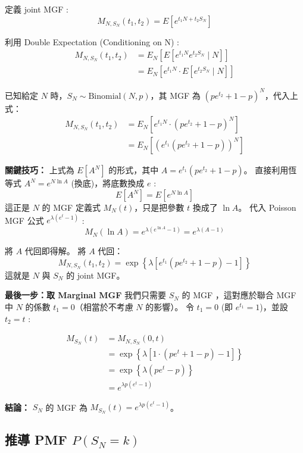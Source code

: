 \documentclass{article}
\begin{document}
\noindent
定義 joint MGF :
$$ M_{N, S_N}(t_1, t_2) = E \left[ e^{t_1 N + t_2 S_N} \right] $$

\noindent
利用 Double Expectation (Conditioning on N) :
\begin{align*}
M_{N, S_N}(t_1, t_2) &= E_N \left[ E \left[ e^{t_1 N} e^{t_2 S_N} \mid N \right] \right] \\
&= E_N \left[ e^{t_1 N} \cdot E \left[ e^{t_2 S_N} \mid N \right] \right]
\end{align*}

\noindent
已知給定 $N$ 時，$S_N \sim \text{Binomial}(N, p)$，其 MGF 為 $(pe^{t_2} + 1 - p)^N$，代入上式：
\begin{align*}
M_{N, S_N}(t_1, t_2) &= E_N \left[ e^{t_1 N} \cdot (pe^{t_2} + 1 - p)^N \right] \\
&= E_N \left[ \left( e^{t_1} (pe^{t_2} + 1 - p) \right)^N \right]
\end{align*}

\noindent
\textbf{{\color{red}關鍵技巧：}}
上式為 $E[A^N]$ 的形式，其中 $A = e^{t_1}(pe^{t_2} + 1 - p)$。
直接利用恆等式 $A^N = e^{N \ln A}$ (換底)，將底數換成 $e$ :
$$ E[A^N] = E[e^{N \ln A}] $$
這正是 $N$ 的 MGF 定義式 $M_N(t)$，只是把參數 $t$ 換成了 $\ln A$。
代入 Poisson MGF 公式 $e^{\lambda(e^t - 1)}$ :
$$ M_N(\ln A) = e^{\lambda(e^{\ln A} - 1)} = e^{\lambda(A - 1)} $$

\noindent
將 $A$ 代回即得解。
\noindent
將 $A$ 代回：
$$ M_{N, S_N}(t_1, t_2) = \exp \left\{ \lambda \left[ e^{t_1}(pe^{t_2} + 1 - p) - 1 \right] \right\} $$
這就是 $N$ 與 $S_N$ 的 joint MGF。

\noindent
\textbf{最後一步：取 Marginal MGF}
我們只需要 $S_N$ 的 MGF ，這對應於聯合 MGF 中 $N$ 的係數 $t_1 = 0$（相當於不考慮 $N$ 的影響）。
令 $t_1 = 0$ (即 $e^{t_1} = 1$)，並設 $t_2 = t$ :

\begin{align*}
M_{S_N}(t) &= M_{N, S_N}(0, t) \\
&= \exp \left\{ \lambda \left[ 1 \cdot (pe^t + 1 - p) - 1 \right] \right\} \\
&= \exp \left\{ \lambda (pe^t - p) \right\} \\
&= e^{\lambda p (e^t - 1)}
\end{align*}

\noindent
\textbf{結論：} $S_N$ 的 MGF 為 $M_{S_N}(t) = e^{\lambda p (e^t - 1)}$。

\subsection*{推導 PMF $P(S_N = k)$}
\end{document}
